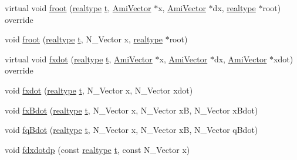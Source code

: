 \begin{DoxyCompactItemize}
\item 
virtual void \mbox{\hyperlink{classamici_1_1_model___o_d_e_a94a623b51fd0ecd7a9a549eb7da2fc04}{froot}} (\mbox{\hyperlink{namespaceamici_a1bdce28051d6a53868f7ccbf5f2c14a3}{realtype}} \mbox{\hyperlink{classamici_1_1_model_a711281d57e9710226face29151cc4641}{t}}, \mbox{\hyperlink{classamici_1_1_ami_vector}{Ami\+Vector}} $\ast$x, \mbox{\hyperlink{classamici_1_1_ami_vector}{Ami\+Vector}} $\ast$dx, \mbox{\hyperlink{namespaceamici_a1bdce28051d6a53868f7ccbf5f2c14a3}{realtype}} $\ast$root) override
\item 
void \mbox{\hyperlink{classamici_1_1_model___o_d_e_ab76d051378cedaaeffa04f18c00e79cb}{froot}} (\mbox{\hyperlink{namespaceamici_a1bdce28051d6a53868f7ccbf5f2c14a3}{realtype}} \mbox{\hyperlink{classamici_1_1_model_a711281d57e9710226face29151cc4641}{t}}, N\+\_\+\+Vector x, \mbox{\hyperlink{namespaceamici_a1bdce28051d6a53868f7ccbf5f2c14a3}{realtype}} $\ast$root)
\item 
virtual void \mbox{\hyperlink{classamici_1_1_model___o_d_e_a33461bc9bc047e838607d958eb29621a}{fxdot}} (\mbox{\hyperlink{namespaceamici_a1bdce28051d6a53868f7ccbf5f2c14a3}{realtype}} \mbox{\hyperlink{classamici_1_1_model_a711281d57e9710226face29151cc4641}{t}}, \mbox{\hyperlink{classamici_1_1_ami_vector}{Ami\+Vector}} $\ast$x, \mbox{\hyperlink{classamici_1_1_ami_vector}{Ami\+Vector}} $\ast$dx, \mbox{\hyperlink{classamici_1_1_ami_vector}{Ami\+Vector}} $\ast$xdot) override
\item 
void \mbox{\hyperlink{classamici_1_1_model___o_d_e_aa08f195ec3f1e9ec3d208abfbf27b23a}{fxdot}} (\mbox{\hyperlink{namespaceamici_a1bdce28051d6a53868f7ccbf5f2c14a3}{realtype}} \mbox{\hyperlink{classamici_1_1_model_a711281d57e9710226face29151cc4641}{t}}, N\+\_\+\+Vector x, N\+\_\+\+Vector xdot)
\item 
void \mbox{\hyperlink{classamici_1_1_model___o_d_e_a433a0e1e4330ef433823a61f1fc45a5a}{fx\+Bdot}} (\mbox{\hyperlink{namespaceamici_a1bdce28051d6a53868f7ccbf5f2c14a3}{realtype}} \mbox{\hyperlink{classamici_1_1_model_a711281d57e9710226face29151cc4641}{t}}, N\+\_\+\+Vector x, N\+\_\+\+Vector xB, N\+\_\+\+Vector x\+Bdot)
\item 
void \mbox{\hyperlink{classamici_1_1_model___o_d_e_a9d0e4612af8d7b3c418d000b5e9ba84f}{fq\+Bdot}} (\mbox{\hyperlink{namespaceamici_a1bdce28051d6a53868f7ccbf5f2c14a3}{realtype}} \mbox{\hyperlink{classamici_1_1_model_a711281d57e9710226face29151cc4641}{t}}, N\+\_\+\+Vector x, N\+\_\+\+Vector xB, N\+\_\+\+Vector q\+Bdot)
\item 
void \mbox{\hyperlink{classamici_1_1_model___o_d_e_a371aa66b99b1b3b20ed2e533d9b44870}{fdxdotdp}} (const \mbox{\hyperlink{namespaceamici_a1bdce28051d6a53868f7ccbf5f2c14a3}{realtype}} \mbox{\hyperlink{classamici_1_1_model_a711281d57e9710226face29151cc4641}{t}}, const N\+\_\+\+Vector x)

\end{DoxyCompactItemize}
